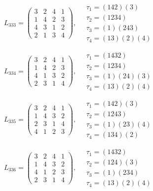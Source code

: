 $L_{333} = \begin{pmatrix} 3 & 2 & 4 & 1 \\ 1 & 4 & 2 & 3 \\ 4 & 3 & 1 & 2 \\ 2 & 1 & 3 & 4 \end{pmatrix}, \quad \begin{matrix} \tau_{1} = (1 4 2)(3) \\ \tau_{2} = (1 2 3 4) \\ \tau_{3} = (1)(2 4 3) \\ \tau_{4} = (1 3)(2)(4) \end{matrix}$

$L_{334} = \begin{pmatrix} 3 & 2 & 4 & 1 \\ 1 & 4 & 2 & 3 \\ 4 & 1 & 3 & 2 \\ 2 & 3 & 1 & 4 \end{pmatrix}, \quad \begin{matrix} \tau_{1} = (1 4 3 2) \\ \tau_{2} = (1 2 3 4) \\ \tau_{3} = (1)(2 4)(3) \\ \tau_{4} = (1 3)(2)(4) \end{matrix}$

$L_{335} = \begin{pmatrix} 3 & 2 & 4 & 1 \\ 1 & 4 & 3 & 2 \\ 2 & 3 & 1 & 4 \\ 4 & 1 & 2 & 3 \end{pmatrix}, \quad \begin{matrix} \tau_{1} = (1 4 2)(3) \\ \tau_{2} = (1 2 4 3) \\ \tau_{3} = (1)(2 3)(4) \\ \tau_{4} = (1 3 4)(2) \end{matrix}$

$L_{336} = \begin{pmatrix} 3 & 2 & 4 & 1 \\ 1 & 4 & 3 & 2 \\ 4 & 1 & 2 & 3 \\ 2 & 3 & 1 & 4 \end{pmatrix}, \quad \begin{matrix} \tau_{1} = (1 4 3 2) \\ \tau_{2} = (1 2 4)(3) \\ \tau_{3} = (1)(2 3 4) \\ \tau_{4} = (1 3)(2)(4) \end{matrix}$

